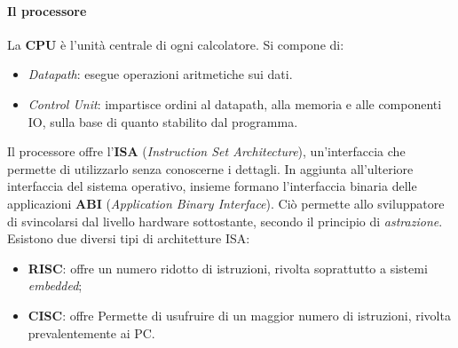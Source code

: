 \documentclass[class=book, crop=false]{standalone}
\begin{document}
\paragraph*{Il processore}
La \textbf{CPU} è l'unità centrale di ogni calcolatore. Si compone di:
\begin{itemize}[noitemsep]
	\item \emph{Datapath}: esegue operazioni aritmetiche sui dati.
	\item \emph{Control Unit}: impartisce ordini al datapath, alla memoria e alle componenti IO, sulla base di quanto stabilito dal programma.
\end{itemize}
Il processore offre l'\textbf{ISA} (\emph{Instruction Set Architecture}), un'interfaccia che permette di utilizzarlo senza conoscerne i dettagli. In aggiunta all'ulteriore interfaccia del sistema operativo, insieme formano l'interfaccia binaria delle applicazioni \textbf{ABI} (\emph{Application Binary Interface}). Ciò permette allo sviluppatore di svincolarsi dal livello hardware sottostante, secondo il principio di \emph{astrazione}.\\ Esistono due diversi tipi di architetture ISA:
\begin{itemize}[noitemsep,nolistsep]
	\item \textbf{RISC}: offre un numero ridotto di istruzioni, rivolta soprattutto a sistemi \emph{embedded};
	\item \textbf{CISC}: offre Permette di usufruire di un maggior numero di istruzioni, rivolta prevalentemente ai PC.
\end{itemize}
\end{document}
